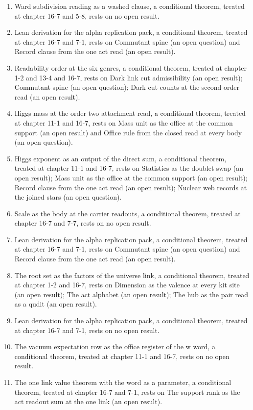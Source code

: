 \begin{enumerate}
\item Ward subdivision reading as a washed clause, a conditional theorem, treated at chapter 16-7 and 5-8, rests on no open result.
\item Lean derivation for the alpha replication pack, a conditional theorem, treated at chapter 16-7 and 7-1, rests on Commutant spine (an open question) and Record clause from the one act read (an open result).
\item Readability order at the six genres, a conditional theorem, treated at chapter 1-2 and 13-4 and 16-7, rests on Dark link cut admissibility (an open result); Commutant spine (an open question); Dark cut counts at the second order read (an open result).
\item Higgs mass at the order two attachment read, a conditional theorem, treated at chapter 11-1 and 16-7, rests on Mass unit as the office at the common support (an open result) and Office rule from the closed read at every body (an open question).
\item Higgs exponent as an output of the direct sum, a conditional theorem, treated at chapter 11-1 and 16-7, rests on Statistics as the doublet swap (an open result); Mass unit as the office at the common support (an open result); Record clause from the one act read (an open result); Nuclear web records at the joined stars (an open question).
\item Scale as the body at the carrier readouts, a conditional theorem, treated at chapter 16-7 and 7-7, rests on no open result.
\item Lean derivation for the alpha replication pack, a conditional theorem, treated at chapter 16-7 and 7-1, rests on Commutant spine (an open question) and Record clause from the one act read (an open result).
\item The root set as the factors of the universe link, a conditional theorem, treated at chapter 1-2 and 16-7, rests on Dimension as the valence at every kit site (an open result); The act alphabet (an open result); The hub as the pair read as a qudit (an open result).
\item Lean derivation for the alpha replication pack, a conditional theorem, treated at chapter 16-7 and 7-1, rests on no open result.
\item The vacuum expectation row as the office register of the w word, a conditional theorem, treated at chapter 11-1 and 16-7, rests on no open result.
\item The one link value theorem with the word as a parameter, a conditional theorem, treated at chapter 16-7 and 7-1, rests on The support rank as the act readout sum at the one link (an open result).

\end{enumerate}
